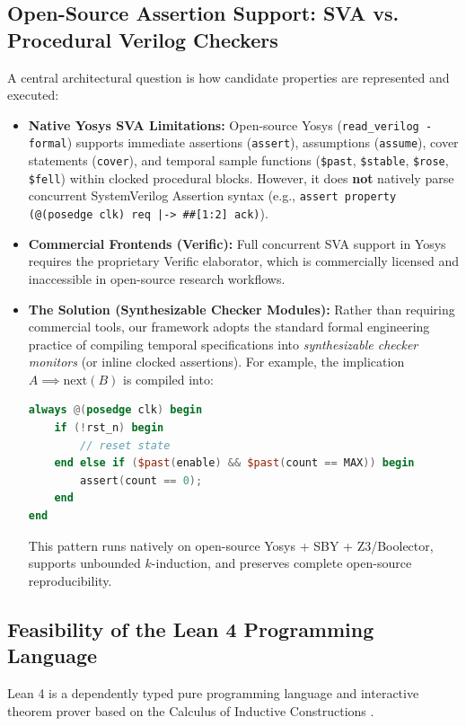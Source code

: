 \documentclass[11pt,a4paper]{article}
\begin{document}
\subsection{Open-Source Assertion Support: SVA vs. Procedural Verilog Checkers}
A central architectural question is how candidate properties are represented and executed:
\begin{itemize}
    \item \textbf{Native Yosys SVA Limitations:} Open-source Yosys (\texttt{read\_verilog -formal}) supports immediate assertions (\texttt{assert}), assumptions (\texttt{assume}), cover statements (\texttt{cover}), and temporal sample functions (\texttt{\$past}, \texttt{\$stable}, \texttt{\$rose}, \texttt{\$fell}) within clocked procedural blocks. However, it does \textbf{not} natively parse concurrent SystemVerilog Assertion syntax (e.g., \texttt{assert property (@(posedge clk) req |-> ##[1:2] ack)}).
    \item \textbf{Commercial Frontends (Verific):} Full concurrent SVA support in Yosys requires the proprietary Verific elaborator, which is commercially licensed and inaccessible in open-source research workflows.
    \item \textbf{The Solution (Synthesizable Checker Modules):} Rather than requiring commercial tools, our framework adopts the standard formal engineering practice of compiling temporal specifications into \textit{synthesizable checker monitors} (or inline clocked assertions). For example, the implication $A \implies \text{next}(B)$ is compiled into:
\begin{lstlisting}[language=Verilog]
always @(posedge clk) begin
    if (!rst_n) begin
        // reset state
    end else if ($past(enable) && $past(count == MAX)) begin
        assert(count == 0);
    end
end
\end{lstlisting}
    This pattern runs natively on open-source Yosys + SBY + Z3/Boolector, supports unbounded $k$-induction, and preserves complete open-source reproducibility.
\end{itemize}

\subsection{Feasibility of the Lean 4 Programming Language}
Lean 4 is a dependently typed pure programming language and interactive theorem prover based on the Calculus of Inductive Constructions \cite{moura2021lean4}.
\end{document}
